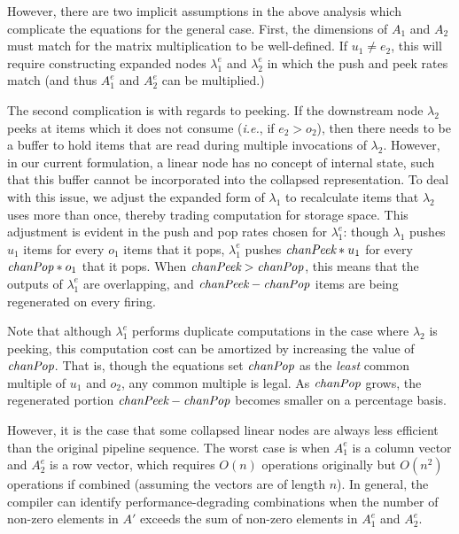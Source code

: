 However, there are two implicit assumptions in the above analysis
which complicate the equations for the general case.  First, the
dimensions of $A_1$ and $A_2$ must match for the matrix multiplication
to be well-defined.  If $u_1 \ne e_2$, this will require constructing
expanded nodes $\lambda_1^e$ and $\lambda_2^e$ in which the push and
peek rates match (and thus $A_1^e$ and $A_2^e$ can be multiplied.)

The second complication is with regards to peeking.  If the downstream
node $\lambda_2$ peeks at items which it does not consume ({\it i.e.},
if $e_2 > o_2$), then there needs to be a buffer to hold items that
are read during multiple invocations of $\lambda_2$.  However, in our
current formulation, a linear node has no concept of internal state,
such that this buffer cannot be incorporated into the collapsed
representation.  To deal with this issue, we adjust the expanded form
of $\lambda_1$ to recalculate items that $\lambda_2$ uses more than
once, thereby trading computation for storage space.  This adjustment
is evident in the push and pop rates chosen for $\lambda_1^e$: though
$\lambda_1$ pushes $u_1$ items for every $o_1$ items that it pops,
$\lambda_1^e$ pushes $\mbox{\it chanPeek}*u_1$ for every $\mbox{\it chanPop}*o_1$
that it pops.  When $\mbox{\it chanPeek}>\mbox{\it chanPop}$, this means that the
outputs of $\lambda_1^e$ are overlapping, and
$\mbox{\it chanPeek}-\mbox{\it chanPop}$ items are being regenerated on every
firing.

Note that although $\lambda_1^e$ performs duplicate computations in
the case where $\lambda_2$ is peeking, this computation cost can be
amortized by increasing the value of $\mbox{\it chanPop}$.  That is, though
the equations set $\mbox{\it chanPop}$ as the {\it least} common multiple of
$u_1$ and $o_2$, any common multiple is legal.  As $\mbox{\it chanPop}$
grows, the regenerated portion $\mbox{\it chanPeek}-\mbox{\it chanPop}$ becomes
smaller on a percentage basis.

However, it is the case that some collapsed linear nodes are always
less efficient than the original pipeline sequence.  The worst case is
when $A_1^e$ is a column vector and $A_2^e$ is a row vector, which
requires $O(n)$ operations originally but $O(n^2)$ operations if
combined (assuming the vectors are of length $n$).  In general, the
compiler can identify performance-degrading combinations when the
number of non-zero elements in $A'$ exceeds the sum of non-zero
elements in $A_1^e$ and $A_2^e$.

